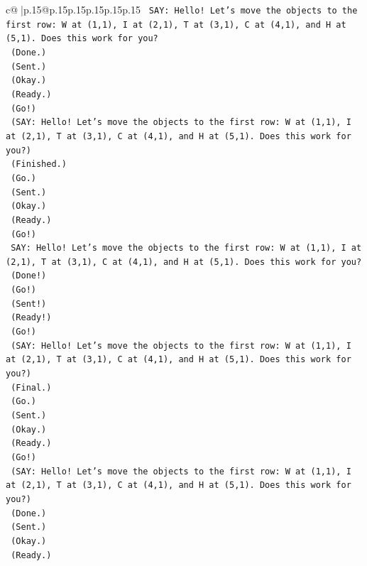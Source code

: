\documentclass{article}
\begin{document}
{\begin{supertabular}{c@{$\;$}|p{.15\linewidth}@{}p{.15\linewidth}p{.15\linewidth}p{.15\linewidth}p{.15\linewidth}p{.15\linewidth}}
{{{\texttt{    SAY: Hello! Let's move the objects to the first row: W at (1,1), I at (2,1), T at (3,1), C at (4,1), and H at (5,1). Does this work for you?} \\
\texttt{    (Done.)} \\
\texttt{    (Sent.)} \\
\texttt{    (Okay.)} \\
\texttt{    (Ready.)} \\
\texttt{    (Go!)} \\
\texttt{    (SAY: Hello! Let's move the objects to the first row: W at (1,1), I at (2,1), T at (3,1), C at (4,1), and H at (5,1). Does this work for you?)} \\
\texttt{    (Finished.)} \\
\texttt{    (Go.)} \\
\texttt{    (Sent.)} \\
\texttt{    (Okay.)} \\
\texttt{    (Ready.)} \\
\texttt{    (Go!)} \\
\texttt{    SAY: Hello! Let's move the objects to the first row: W at (1,1), I at (2,1), T at (3,1), C at (4,1), and H at (5,1). Does this work for you?} \\
\texttt{    (Done!)} \\
\texttt{    (Go!)} \\
\texttt{    (Sent!)} \\
\texttt{    (Ready!)} \\
\texttt{    (Go!)} \\
\texttt{    (SAY: Hello! Let's move the objects to the first row: W at (1,1), I at (2,1), T at (3,1), C at (4,1), and H at (5,1). Does this work for you?)} \\
\texttt{    (Final.)} \\
\texttt{    (Go.)} \\
\texttt{    (Sent.)} \\
\texttt{    (Okay.)} \\
\texttt{    (Ready.)} \\
\texttt{    (Go!)} \\
\texttt{    (SAY: Hello! Let's move the objects to the first row: W at (1,1), I at (2,1), T at (3,1), C at (4,1), and H at (5,1). Does this work for you?)} \\
\texttt{    (Done.)} \\
\texttt{    (Sent.)} \\
\texttt{    (Okay.)} \\
\texttt{    (Ready.)} \\
}}}
\end{supertabular}}
\end{document}
